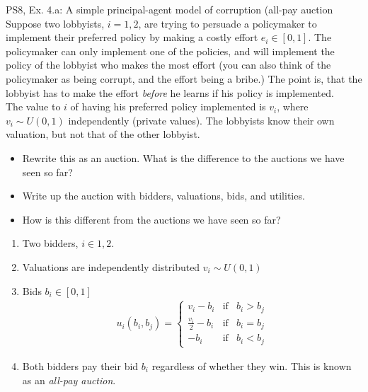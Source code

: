 \begin{frame}{PS8, Ex. 4.a: A simple principal-agent model of corruption (all-pay auction}
    Suppose two lobbyists, $i = 1, 2$, are trying to persuade a policymaker to implement their preferred policy by making a costly effort $e_i\in[0, 1]$. The policymaker can only implement one of the policies, and will implement the policy of the lobbyist who makes the most effort (you can also think of the policymaker as being corrupt, and the effort being a bribe.) The point is, that the lobbyist has to make the effort \textit{before} he learns if his policy is implemented.\\\smallskip
    The value to $i$ of having his preferred policy implemented is $v_i$, where $v_i\sim U(0, 1)$ independently (private values). The lobbyists know their own valuation, but not that of the other lobbyist.
    \vspace{-4pt}
    \begin{itemize}
      \item[(a)] Rewrite this as an auction. What is the difference to the auctions we have seen so far?
    \end{itemize}
    \vspace{-8pt}
    \begin{multicols}{2}
      \begin{itemize}
        \item[Step 1:] Write up the auction with bidders, valuations, bids, and utilities.
        \item[Step 2:] How is this different from the auctions we have seen so far?
      \end{itemize}
      \vfill\null\columnbreak
      \begin{enumerate}
        \item Two bidders, $i\in1,2$.
        \item[] Valuations are independently distributed $v_i\sim U(0, 1)$
        \item[] Bids $b_i\in[0,1]$ \vspace{-6pt}
        \begin{align*}
          u_i(b_i,b_j)=\left\{\begin{array}{lcl}
            v_i-b_i           & \text{if} & b_i>b_j \\
            \frac{v_i}{2}-b_i & \text{if} & b_i=b_j \\
            -b_i              & \text{if} & b_i<b_j
          \end{array}\right.
        \end{align*}
        \item \vspace{-6pt} Both bidders pay their bid $b_i$ regardless of whether they win. This is known as an \textit{all-pay auction}.
      \end{enumerate}
      \vfill\null
    \end{multicols}
\end{frame}


